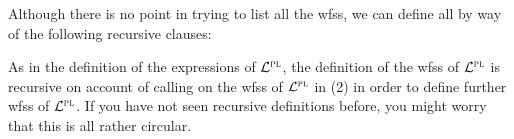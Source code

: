 %
Although there is no point in trying to list all the wfss, we can define all  by way of the following recursive clauses:


As in the definition of the expressions of $\mathcal{L}^{\textsc{pl}}$, the definition of the wfss of $\mathcal{L}^{\textsc{pl}}$ is recursive on account of calling on the wfss of $\mathcal{L}^{\textsc{pl}}$ in (2) in order to define further wfss of $\mathcal{L}^{\textsc{pl}}$.
If you have not seen recursive definitions before, you might worry that this is all rather circular.

